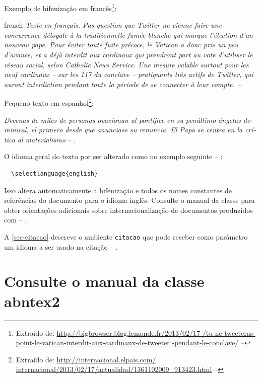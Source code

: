 Exemplo de hifenização em francês\footnote{Extraído de:
\url{http://bigbrowser.blog.lemonde.fr/2013/02/17
     /tu-ne-tweeteras-point-le-vatican-interdit-aux-cardinaux-de-tweeter
     -pendant-le-conclave/} -- \showfont}:

\begin{otherlanguage*}{french}
\textit{Texte en français. Pas question que Twitter ne vienne faire une
concurrence déloyale à la traditionnelle fumée blanche qui mar\-que l'élection
d'un nouveau pape. Pour éviter toute fuite précoce, le Vatican a donc pris un
peu d'avance, et a déjà interdit aux cardinaux qui prendront part au vote
d'utiliser le réseau social, selon Catholic News Service. Une mesure valable
surtout pour les neuf cardinaux – sur les 117 du conclave – pratiquants très
actifs de Twitter, qui auront interdiction pendant toute la période de se
connecter à leur compte. -- \showfont}
\end{otherlanguage*}

Pequeno texto em espanhol\footnote{Extraído de:
\url{http://internacional.elpais.com/
     internacional/2013/02/17/actualidad/1361102009_913423.html} -- \showfont}:

\foreignlanguage{spanish}{\textit{Decenas de miles de personas ovacionan al
pontífice en su penúltimo ángelus dominical, el primero desde que anunciase su
renuncia. El Papa se centra en la crítica al materialismo}} -- \showfont.

O idioma geral do texto por ser alterado como no exemplo seguinte -- \showfont:

\begin{verbatim}
  \selectlanguage{english}
\end{verbatim}

Isso altera automaticamente a hifenização e todos os nomes constantes de
referências do documento para o idioma inglês. Consulte o manual da classe
\cite{abntex2classe} para obter orientações adicionais sobre internacionalização
de documentos produzidos com \abnTeX{} -- \showfont.

A \autoref{sec-citacao} descreve o ambiente \texttt{citacao} que pode receber
como parâmetro um idioma a ser usado na citação -- \showfont.

\section{Consulte o manual da classe \textsf{abntex2}}

